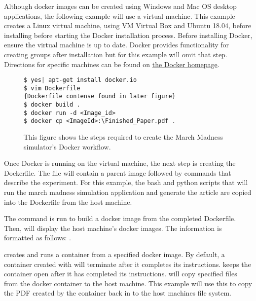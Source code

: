 \documentclass{IEEEtran}
\begin{document}
Although docker images can be created using Windows and Mac OS desktop applications, the following example will use a virtual machine. This example creates a Linux virtual machine, using VM Virtual Box and Ubuntu 18.04, before installing before starting the Docker installation process. 
Before installing Docker, ensure the virtual machine is up to date. Docker provides functionality for creating groups after installation but for this example will omit that step. Directions for specific machines can be found on \href{https://docs.docker.com/get-docker/}{the Docker homepage}.

\begin{figure}[h]
\centering
\begin{mdframed}
\small
\begin{verbatim}
$ yes| apt-get install docker.io
$ vim Dockerfile
{Dockerfile contense found in later figure}
$ docker build .
$ docker run -d <Image_id>
$ docker cp <ImageId>:\Finished_Paper.pdf .
\end{verbatim}
\end{mdframed}
\caption{\footnotesize This figure shows the steps required to create the March Madness simulator's Docker workflow.  }
\label{fig2}
\end{figure}

Once Docker is running on the virtual machine, the next step is creating the Dockerfile. The file will contain a parent image followed by commands that describe the experiment. For this example, the bash and python scripts that will run the march madness simulation application and generate the article are copied into the Dockerfile from the host machine.

The command  is run to build a docker image from the completed Dockerfile. Then,  will display the host machine's docker images. The information is formatted as follows: .

 creates and runs a container from a specified docker image. By default, a container created with  will terminate after it completes its instructions.  keeps the container open after it has completed its instructions. 
  will copy specified files from the docker container to the host machine. This example will use this to copy the PDF created by the container back in to the host machines file system.
 
\end{document}
